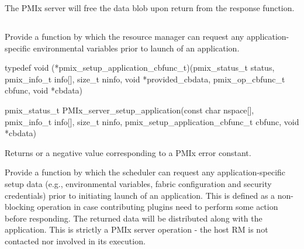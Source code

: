The PMIx server will free the data blob upon return from the response function.


\subsection{}

\summary

Provide a function by which the resource manager can request any application-specific environmental variables prior to launch of an application.

\format

\cspecificstart
\begin{codepar}
typedef void (*pmix_setup_application_cbfunc_t)(pmix_status_t status,
                                                pmix_info_t info[], size_t ninfo,
                                                void *provided_cbdata,
                                                pmix_op_cbfunc_t cbfunc, void *cbdata)

pmix_status_t PMIx_server_setup_application(const char nspace[],
                                            pmix_info_t info[], size_t ninfo,
                                            pmix_setup_application_cbfunc_t cbfunc,
                                            void *cbdata)
\end{codepar}
\cspecificend

\begin{arglist}
\end{arglist}

Returns  or a negative value corresponding to a PMIx error constant.

\descr

Provide a function by which the scheduler can request any application-specific setup data (e.g., environmental variables, fabric configuration and security credentials) prior to initiating launch of an application.
This is defined as a non-blocking operation in case contributing plugins need to perform some action before responding.
The returned data will be distributed along with the application. This is strictly a \ac{PMIx} server operation - the host \ac{RM} is not contacted nor involved in its execution.

